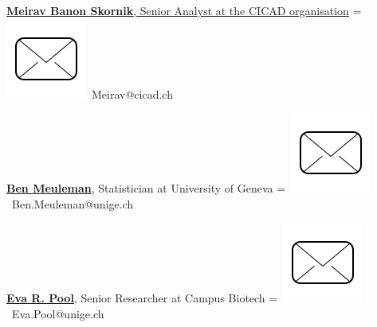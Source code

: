 \documentclass[]{plushcv}
\begin{document}
\begin{minipage}[t]{0.70\textwidth}
\href{https://genev.unige.ch/research/people/Jose-Manuel-De-Abreu-Nunes}{\textbf{Meirav Banon Skornik}, Senior Analyst at the CICAD organisation}
\begingroup
{}=\hbox{
\includegraphics[scale=0.1,trim={0 1cm 0cm 0cm}]{icons/main/mail.png}\hspace{0.1cm} Meirav@cicad.ch
}
\parbox{\wd0}{}\endgroup
\sectionsep

\href{https://www.unige.ch/cisa/center/members/meuleman-ben/}{\textbf{Ben Meuleman}}, Statistician at University of Geneva
\begingroup
{}=\hbox{
\includegraphics[scale=0.1,trim={0 1cm 0cm 0cm}]{icons/main/mail.png}\hspace{0.1cm} Ben.Meuleman@unige.ch
}
\parbox{\wd0}{}\endgroup
\sectionsep



\href{https://www.researchgate.net/profile/Eva-Pool}{\textbf{Eva R. Pool}}, Senior Researcher at Campus Biotech 
\begingroup
{}=\hbox{
\includegraphics[scale=0.1,trim={0 1cm 0cm 0cm}]{icons/main/mail.png}\hspace{0.1cm} Eva.Pool@unige.ch
}
\parbox{\wd0}{}\endgroup
\sectionsep

\end{minipage} 
\hfill
\end{document}
